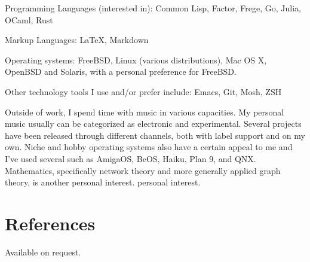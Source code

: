 \documentclass[margintitle,line]{res}
\begin{document}
\begin{resume}
Programming Languages (interested in): Common Lisp, Factor, Frege, Go, Julia, OCaml, Rust

Markup Languages: LaTeX, Markdown

Operating systems: FreeBSD, Linux (various distributions), Mac OS X, OpenBSD and Solaris,
with a personal preference for FreeBSD.

Other technology tools I use and/or prefer include: Emacs, Git, Mosh, ZSH

Outside of work, I spend time with music in various
capacities. My personal music usually can be categorized as electronic
and experimental. Several projects have been released through
different channels, both with label support and on my own. Niche and hobby
operating systems also have a certain appeal to me and I've used several such
as AmigaOS, BeOS, Haiku, Plan 9, and QNX. Mathematics, specifically network theory
and more generally applied graph theory, is another personal interest.
personal interest.

\section{References}

Available on request.

\end{resume}
\end{document}

